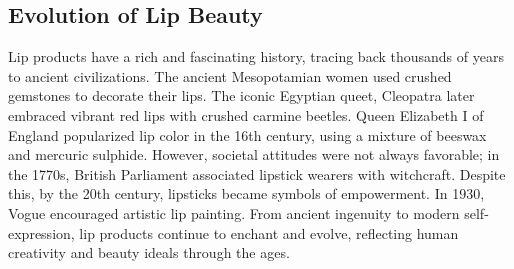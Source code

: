 \documentclass{article}
\begin{document}
\subsection{Evolution of Lip Beauty}

Lip products have a rich and fascinating history, tracing back thousands of years to ancient civilizations. The ancient Mesopotamian women used crushed gemstones to decorate their lips. The iconic Egyptian queet, Cleopatra later embraced vibrant red lips with crushed carmine beetles. Queen Elizabeth I of England popularized lip color in the 16th century, using a mixture of beeswax and mercuric sulphide. However, societal attitudes were not always favorable; in the 1770s, British Parliament associated lipstick wearers with witchcraft. Despite this, by the 20th century, lipsticks became symbols of empowerment. In 1930, Vogue encouraged artistic lip painting. From ancient ingenuity to modern self-expression, lip products continue to enchant and evolve, reflecting human creativity and beauty ideals through the ages.
\end{document}
